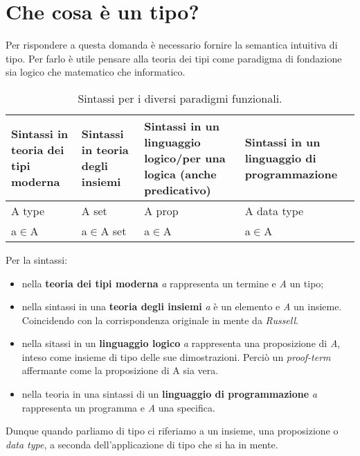 \section{Che cosa \`e un tipo?}
\label{sec:cosa e un tipo}
Per rispondere a questa domanda \`e necessario fornire la semantica intuitiva di tipo. Per farlo \`e utile pensare alla teoria dei tipi come paradigma di fondazione sia logico che matematico che informatico.

\begin{table}[h]
\centering
\begin{tabularx}{\textwidth}{XXXX}
\hline 
\rowcolor{orange}
{\color[HTML]{FFFFFF}\textbf{Sintassi in teoria dei tipi moderna}} & {\color[HTML]{FFFFFF}\textbf{Sintassi in teoria degli insiemi}} & {\color[HTML]{FFFFFF} \textbf{Sintassi in un linguaggio logico/per una logica (anche predicativo)}} & {\color[HTML]{FFFFFF}\textbf{Sintassi in un linguaggio di programmazione}} \\
\hline\hline 
A type & A set & A prop & A data type \\ 
\hline 
a$\in$A & a$\in$A set & a$\in$A & a$\in$A \\ 
\hline 
\end{tabularx}
\caption{\label{tab:sintassi-paradigmi-funzionali}Sintassi per i diversi paradigmi funzionali.} 
\end{table}
\noindent
Per la sintassi:
\begin{itemize} 
\item nella \textbf{teoria dei tipi moderna} \textit{a} rappresenta un termine e \textit{A} un tipo;
\item nella sintassi in una \textbf{teoria degli insiemi} \textit{a} \`e un elemento e \textit{A} un insieme. Coincidendo con la corrispondenza originale in mente da \textit{Russell}.
\item nella sitassi in un \textbf{linguaggio logico} \textit{a} rappresenta una proposizione di \textit{A}, inteso come insieme di tipo delle sue dimostrazioni. Perci\`o un \textit{proof-term} affermante come la proposizione di A sia vera.
\item nella teoria in una sintassi di un \textbf{linguaggio di programmazione} \textit{a} rappresenta un programma e \textit{A} una specifica.
\end{itemize}
\noindent
Dunque quando parliamo di tipo ci riferiamo a un insieme, una proposizione o \textit{data type}, a seconda dell'applicazione di tipo che si ha in mente.\\\\
